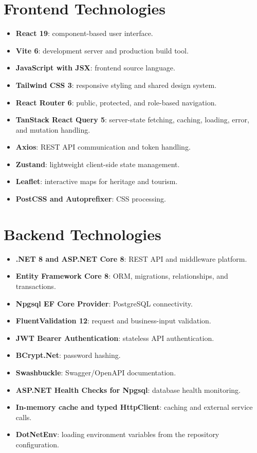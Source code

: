 \documentclass[12pt,a4paper]{report}
\begin{document}
\section{Frontend Technologies}

\begin{itemize}
  \item \textbf{React 19}: component-based user interface.
  \item \textbf{Vite 6}: development server and production build tool.
  \item \textbf{JavaScript with JSX}: frontend source language.
  \item \textbf{Tailwind CSS 3}: responsive styling and shared design system.
  \item \textbf{React Router 6}: public, protected, and role-based navigation.
  \item \textbf{TanStack React Query 5}: server-state fetching, caching, loading, error, and mutation handling.
  \item \textbf{Axios}: REST API communication and token handling.
  \item \textbf{Zustand}: lightweight client-side state management.
  \item \textbf{Leaflet}: interactive maps for heritage and tourism.
  \item \textbf{PostCSS and Autoprefixer}: CSS processing.
\end{itemize}

\section{Backend Technologies}

\begin{itemize}
  \item \textbf{.NET 8 and ASP.NET Core 8}: REST API and middleware platform.
  \item \textbf{Entity Framework Core 8}: ORM, migrations, relationships, and transactions.
  \item \textbf{Npgsql EF Core Provider}: PostgreSQL connectivity.
  \item \textbf{FluentValidation 12}: request and business-input validation.
  \item \textbf{JWT Bearer Authentication}: stateless API authentication.
  \item \textbf{BCrypt.Net}: password hashing.
  \item \textbf{Swashbuckle}: Swagger/OpenAPI documentation.
  \item \textbf{ASP.NET Health Checks for Npgsql}: database health monitoring.
  \item \textbf{In-memory cache and typed HttpClient}: caching and external service calls.
  \item \textbf{DotNetEnv}: loading environment variables from the repository configuration.
\end{itemize}
\end{document}
